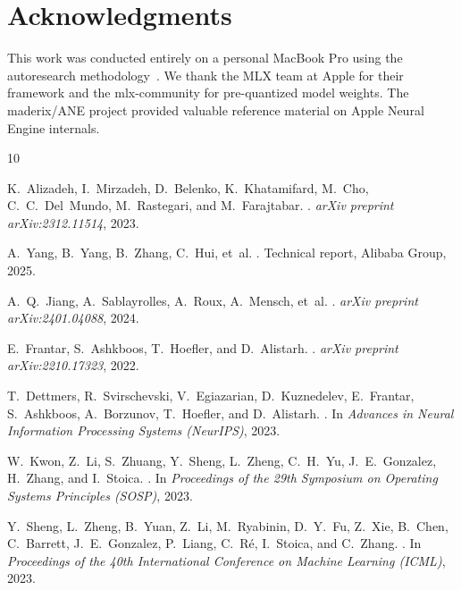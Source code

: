 \documentclass[11pt,twocolumn]{article}
\begin{document}
\section*{Acknowledgments}
This work was conducted entirely on a personal MacBook Pro using the autoresearch methodology~\cite{karpathy2025autoresearch}.
We thank the MLX team at Apple for their framework and the mlx-community for pre-quantized model weights.
The maderix/ANE project provided valuable reference material on Apple Neural Engine internals.


\begin{thebibliography}{10}

K.~Alizadeh, I.~Mirzadeh, D.~Belenko, K.~Khatamifard, M.~Cho, C.~C.~Del~Mundo, M.~Rastegari, and M.~Farajtabar.
.
\newblock \emph{arXiv preprint arXiv:2312.11514}, 2023.

A.~Yang, B.~Yang, B.~Zhang, C.~Hui, et~al.
.
\newblock Technical report, Alibaba Group, 2025.

A.~Q.~Jiang, A.~Sablayrolles, A.~Roux, A.~Mensch, et~al.
.
\newblock \emph{arXiv preprint arXiv:2401.04088}, 2024.

E.~Frantar, S.~Ashkboos, T.~Hoefler, and D.~Alistarh.
.
\newblock \emph{arXiv preprint arXiv:2210.17323}, 2022.

T.~Dettmers, R.~Svirschevski, V.~Egiazarian, D.~Kuznedelev, E.~Frantar, S.~Ashkboos, A.~Borzunov, T.~Hoefler, and D.~Alistarh.
.
\newblock In \emph{Advances in Neural Information Processing Systems (NeurIPS)}, 2023.

W.~Kwon, Z.~Li, S.~Zhuang, Y.~Sheng, L.~Zheng, C.~H.~Yu, J.~E.~Gonzalez, H.~Zhang, and I.~Stoica.
.
\newblock In \emph{Proceedings of the 29th Symposium on Operating Systems Principles (SOSP)}, 2023.

Y.~Sheng, L.~Zheng, B.~Yuan, Z.~Li, M.~Ryabinin, D.~Y.~Fu, Z.~Xie, B.~Chen, C.~Barrett, J.~E.~Gonzalez, P.~Liang, C.~R\'{e}, I.~Stoica, and C.~Zhang.
.
\newblock In \emph{Proceedings of the 40th International Conference on Machine Learning (ICML)}, 2023.


\end{thebibliography}
\end{document}
